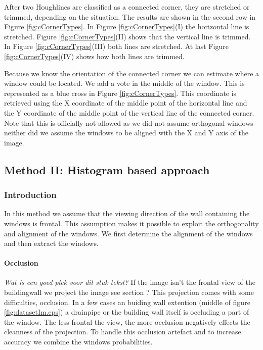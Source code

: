 After two Houghlines are classified as a connected corner, they are stretched or
trimmed, depending on the situation. The results are shown in the second row in
Figure \ref{fig:cCornerTypes}.
In Figure \ref{fig:cCornerTypes}(I)  the horizontal line is stretched.  Figure
\ref{fig:cCornerTypes}(II) shows that the vertical line is trimmed.  In Figure
\ref{fig:cCornerTypes}(III) both lines are stretched.  At last Figure
\ref{fig:cCornerTypes}(IV) shows how both lines are trimmed.


Because we know the orientation of the connected corner we can estimate where
a window could be located.  We add a vote in the middle of the window. 
This is represented as a blue cross in Figure \ref{fig:cCornerTypes}.
This coordinate is retrieved using the X coordinate of the middle point of the horizontal line
and the Y coordinate of the middle point of the vertical line of the connected corner.  
Note that this is officially not allowed as we did not assume orthogonal windows
neither did we assume the windows to be aligned with the X and Y axis of the
image.  



\subsection{Method II: Histogram based approach} 
\subsubsection{Introduction}
In this method we assume that the viewing direction of the wall containing the 
windows is frontal. This assumption makes it possible to exploit the orthogonality and
alignment of the windows. We first determine the alignment of the windows and
then extract the windows. 

\paragraph{Occlusion}
\emph{Wat is een goed plek voor dit stuk tekst?}
\label{lab:occlusion}
If the image isn't the frontal view of the buildingwall we project the image 
see section ?%
This projection comes with some difficulties, occlusion.  In a few cases an
buiding wall extention (middle of figure \ref{fig:datasetIm.eps}) a drainpipe
or the building wall itself is occluding a part of the window.  The less frontal
the view, the more occlusion negatively effects the cleanness of the projection.
To handle this occlusion artefact and to increase accuracy we combine the
windows probabilities.  

